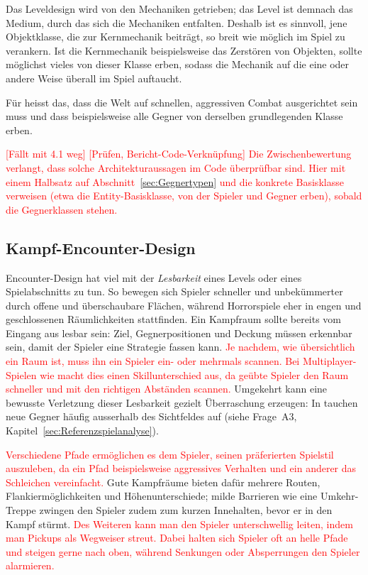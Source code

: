 \documentclass[../Main.tex]{subfiles}
\begin{document}
Das Leveldesign wird von den Mechaniken getrieben; das Level ist demnach das Medium, durch das sich die Mechaniken entfalten.\autocite{gdc_tenprinciples2010} Deshalb ist es sinnvoll, jene Objektklasse, die zur Kernmechanik beiträgt, so breit wie möglich im Spiel zu verankern. Ist die Kernmechanik beispielsweise das Zerstören von Objekten, sollte möglichst vieles von dieser Klasse erben, sodass die Mechanik auf die eine oder andere Weise überall im Spiel auftaucht.\autocite{gdc_movingmountains2020}

Für  heisst das, dass die Welt auf schnellen, aggressiven Combat ausgerichtet sein muss und dass beispielsweise alle Gegner von derselben grundlegenden Klasse erben.\endgroup

\textcolor{red}{[Fällt mit 4.1 weg] [Prüfen, Bericht-Code-Verknüpfung] Die Zwischenbewertung verlangt, dass solche Architekturaussagen im Code überprüfbar sind. Hier mit einem Halbsatz auf Abschnitt~\ref{sec:Gegnertypen} und die konkrete Basisklasse verweisen (etwa die Entity-Basisklasse, von der Spieler und Gegner erben), sobald die Gegnerklassen stehen.}

\subsection{Kampf-Encounter-Design} \label{sec:Encounter}
Encounter-Design hat viel mit der \textit{Lesbarkeit} eines Levels oder eines Spielabschnitts zu tun. So bewegen sich Spieler schneller und unbekümmerter durch offene und überschaubare Flächen, während Horrorspiele eher in engen und geschlossenen Räumlichkeiten stattfinden. Ein Kampfraum sollte bereits vom Eingang aus lesbar sein: Ziel, Gegnerpositionen und Deckung müssen erkennbar sein, damit der Spieler eine Strategie fassen kann.\autocite{gdc_horizonquests2018} \textcolor{red}{Je nachdem, wie übersichtlich ein Raum ist, muss ihn ein Spieler ein- oder mehrmals scannen. Bei Multiplayer-Spielen wie  macht dies einen Skillunterschied aus, da geübte Spieler den Raum schneller und mit den richtigen Abständen scannen.\autocite{totten2014architectural}} Umgekehrt kann eine bewusste Verletzung dieser Lesbarkeit gezielt Überraschung erzeugen: In  tauchen neue Gegner häufig ausserhalb des Sichtfeldes auf (siehe Frage~A3, Kapitel~\ref{sec:Referenzspielanalyse}).

\textcolor{red}{Verschiedene Pfade ermöglichen es dem Spieler, seinen präferierten Spielstil auszuleben, da ein Pfad beispielsweise aggressives Verhalten und ein anderer das Schleichen vereinfacht.\autocite{gdc_tenprinciples2010}} Gute Kampfräume bieten dafür mehrere Routen, Flankiermöglichkeiten und Höhenunterschiede; milde Barrieren wie eine Umkehr-Treppe zwingen den Spieler zudem zum kurzen Innehalten, bevor er in den Kampf stürmt.\autocite{gdc_horizonquests2018} \textcolor{red}{Des Weiteren kann man den Spieler unterschwellig leiten, indem man Pickups als Wegweiser streut. Dabei halten sich Spieler oft an helle Pfade und steigen gerne nach oben, während Senkungen oder Absperrungen den Spieler alarmieren.\autocite{rogers2014levelup}}
\end{document}
